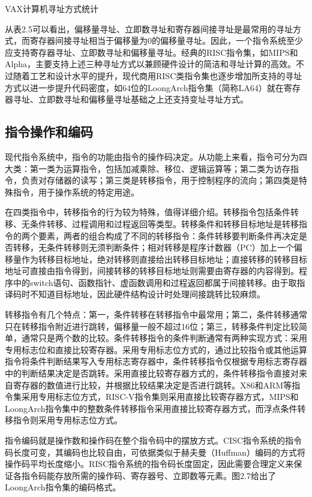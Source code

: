 \documentclass[]{ctexbook}
\begin{document}
\label{tab:vax-addressing}VAX计算机寻址方式统计

从表2.5可以看出，偏移量寻址、立即数寻址和寄存器间接寻址是最常用的寻址方式，而寄存器间接寻址相当于偏移量为0的偏移量寻址。因此，一个指令系统至少应支持寄存器寻址、立即数寻址和偏移量寻址。经典的RISC指令集，如MIPS和Alpha，主要支持上述三种寻址方式以兼顾硬件设计的简洁和寻址计算的高效。不过随着工艺和设计水平的提升，现代商用RISC类指令集也逐步增加所支持的寻址方式以进一步提升代码密度，如64位的LoongArch指令集（简称LA64）就在寄存器寻址、立即数寻址和偏移量寻址基础之上还支持变址寻址方式。

\hypertarget{ux6307ux4ee4ux64cdux4f5cux548cux7f16ux7801}{%
\subsection{指令操作和编码}\label{ux6307ux4ee4ux64cdux4f5cux548cux7f16ux7801}}

现代指令系统中，指令的功能由指令的操作码决定。从功能上来看，指令可分为四大类：第一类为运算指令，包括加减乘除、移位、逻辑运算等；第二类为访存指令，负责对存储器的读写；第三类是转移指令，用于控制程序的流向；第四类是特殊指令，用于操作系统的特定用途。

在四类指令中，转移指令的行为较为特殊，值得详细介绍。转移指令包括条件转移、无条件转移、过程调用和过程返回等类型。转移条件和转移目标地址是转移指令的两个要素，两者的组合构成了不同的转移指令：条件转移要判断条件再决定是否转移，无条件转移则无须判断条件；相对转移是程序计数器（PC）加上一个偏移量作为转移目标地址，绝对转移则直接给出转移目标地址；直接转移的转移目标地址可直接由指令得到，间接转移的转移目标地址则需要由寄存器的内容得到。程序中的switch语句、函数指针、虚函数调用和过程返回都属于间接转移。由于取指译码时不知道目标地址，因此硬件结构设计时处理间接跳转比较麻烦。

转移指令有几个特点：第一，条件转移在转移指令中最常用；第二，条件转移通常只在转移指令附近进行跳转，偏移量一般不超过16位；第三，转移条件判定比较简单，通常只是两个数的比较。条件转移指令的条件判断通常有两种实现方式：采用专用标志位和直接比较寄存器。采用专用标志位方式的，通过比较指令或其他运算指令将条件判断结果写入专用标志寄存器中，条件转移指令仅根据专用标志寄存器中的判断结果决定是否跳转。采用直接比较寄存器方式的，条件转移指令直接对来自寄存器的数值进行比较，并根据比较结果决定是否进行跳转。X86和ARM等指令集采用专用标志位方式，RISC-V指令集则采用直接比较寄存器方式，MIPS和LoongArch指令集中的整数条件转移指令采用直接比较寄存器方式，而浮点条件转移指令则采用专用标志位方式。

指令编码就是操作数和操作码在整个指令码中的摆放方式。CISC指令系统的指令码长度可变，其编码也比较自由，可依据类似于赫夫曼（Huffman）编码的方式将操作码平均长度缩小。RISC指令系统的指令码长度固定，因此需要合理定义来保证各指令码能存放所需的操作码、寄存器号、立即数等元素。图2.7给出了LoongArch指令集的编码格式。
\end{document}
